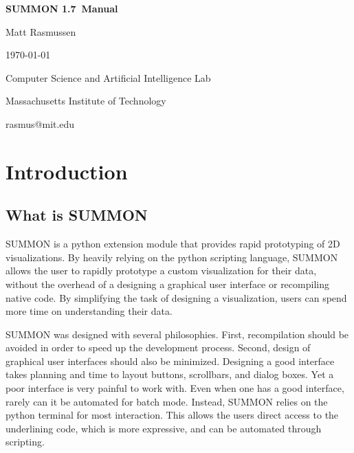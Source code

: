 \documentclass[12pt]{article}
\newcommand{\version}{1.7}
\begin{document}
\begin{titlepage}

\begin{center}

\vspace*{2.5in}

{\huge \bf {}\selectfont 
SUMMON \version\ Manual
}
\vspace*{.5in}

{\large
Matt Rasmussen

\today
}
\vspace*{.5in}

Computer Science and Artificial Intelligence Lab

Massachusetts Institute of Technology

\vspace*{.25in}

rasmus@mit.edu
\end{center}

\end{titlepage}


\tableofcontents

\clearpage

\section{Introduction}
\label{sec:intro}


\subsection{What is SUMMON}

SUMMON is a python extension module that provides rapid prototyping of 2D
visualizations.  By heavily relying on the python scripting language, SUMMON
allows the user to rapidly prototype a custom visualization for their data, 
without the overhead of a designing a graphical user interface or recompiling 
native code.  By simplifying the task of designing a visualization, users can 
spend more time on understanding their data. 

SUMMON was designed with several philosophies.  First, recompilation should
be avoided in order to speed up the development process.  Second, design of
graphical user interfaces should also be minimized.  Designing a good interface
takes planning and time to layout buttons, scrollbars, and dialog boxes.  Yet a 
poor interface is very painful to work with. Even when one has a good interface,
rarely can it be automated for batch mode.  Instead, SUMMON relies on the python
terminal for most interaction.  This allows the users direct access to  the
underlining code, which is more expressive, and can be automated through
scripting.  
\end{document}
